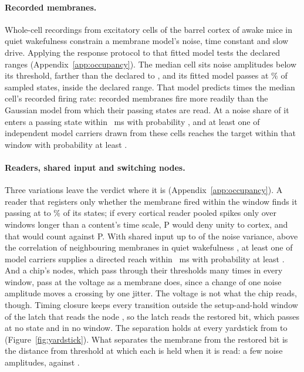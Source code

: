 \documentclass[12pt]{article}
\begin{document}
\paragraph{Recorded membranes.} Whole-cell recordings from
\uRecCellsQuiet{} excitatory cells of the barrel cortex of awake mice in quiet
wakefulness \citep{kiritani2023} constrain a membrane model's noise, time
constant and slow drive. Applying the response protocol to that fitted model
tests the declared ranges (Appendix~\ref{app:occupancy}). The median cell sits \uRecDistanceMed{} noise
amplitudes below its threshold, farther than the declared \uOccDistanceMin{} to
\uOccDistanceMax{}, and its fitted model passes at \uRecPassMedPercent\% of sampled
states, inside the declared range. That model predicts \uRecRateRatioMed{}
times the median cell's recorded firing rate: recorded membranes fire more
readily than the Gaussian model from which their passing states are read. At a noise share of
\uOccShareMin{} it enters a passing state within \uOccContentLongMs{}~ms with
probability \uRecHitMedLong{}, and at least one of \uOccCarriersFew{} independent
model carriers drawn from these cells reaches the target within that window with
probability at least \uRecLinkFewLong{}.

\paragraph{Readers, shared input and switching nodes.} Three variations leave the
verdict where it is (Appendix~\ref{app:occupancy}). A reader that registers only
whether the membrane fired within the window finds it passing at
\uOccCountPassMinPercent{} to \uOccCountPassMaxPercent\% of its states; if every
cortical reader pooled spikes only over windows longer than a content's time
scale, P would deny unity to cortex, and that would count against P. With
shared input up to \uCorShareTol{} of the noise variance, above the correlation
of neighbouring membranes in quiet wakefulness \citep{poulet2008}, at least one of \uOccCarriersMany{} model carriers supplies a directed reach
within \uOccContentLongMs{}~ms with probability at
least \uCorLinkManyTol{}. And a chip's nodes, which pass through their thresholds
many times in every window, pass at the voltage as a membrane does, since a
change of one noise amplitude moves a crossing by one jitter. The voltage is not
what the chip reads, though. Timing closure keeps every transition outside the
setup-and-hold window of the latch that reads the node \citep{ginosar2011}, so
the latch reads the restored bit, which passes at no state and in no window. The
separation holds at every yardstick from \uYardLow{} to \uYardHigh{}
(Figure~\ref{fig:yardstick}). What separates the membrane from the restored bit
is the distance from threshold at which each is held when it is read: a few
noise amplitudes, against \ueMarginToNoise{}.
\end{document}
